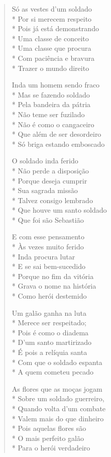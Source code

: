 \begin{verse}
Só as vestes d'um soldado\\*
Por si merecem respeito\\*
Pois já está demonstrando\\*
Uma classe de conceito\\*
Uma classe que procura\\*
Com paciência e bravura\\*
Trazer o mundo direito

Inda um homem sendo fraco\\*
Mas se fazendo soldado\\*
Pela bandeira da pátria\\*
Não teme ser fuzilado\\*
Não é como o cangaceiro\\*
Que além de ser desordeiro\\*
Só briga estando emboscado

O soldado inda ferido\\*
Não perde a disposição\\*
Porque deseja cumprir\\*
Sua sagrada missão\\*
Talvez consigo lembrado\\*
Que houve um santo soldado\\*
Que foi são Sebastião

E com esse pensamento\\*
Às vezes muito ferido\\*
Inda procura lutar\\*
E se sai bem-sucedido\\*
Porque no fim da vitória\\*
Grava o nome na história\\*
Como herói destemido

Um galão ganha na luta\\*
Merece ser respeitado;\\*
Pois é como o diadema\\*
D'um santo martirizado\\*
É pois a relíquia santa\\*
Com que o soldado espanta\\*
A quem cometeu pecado

As flores que as moças jogam\\*
Sobre um soldado guerreiro,\\*
Quando volta d'um combate\\*
Valem mais do que dinheiro\\*
Pois aquelas flores são\\*
O mais perfeito galão\\*
Para o herói verdadeiro


\end{verse}
